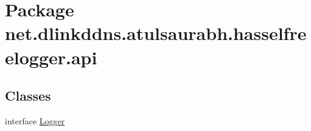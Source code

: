 \hypertarget{namespacenet_1_1dlinkddns_1_1atulsaurabh_1_1hasselfreelogger_1_1api}{}\section{Package net.\+dlinkddns.\+atulsaurabh.\+hasselfreelogger.\+api}
\label{namespacenet_1_1dlinkddns_1_1atulsaurabh_1_1hasselfreelogger_1_1api}
\subsection*{Classes}
\begin{DoxyCompactItemize}
\item 
interface \mbox{\hyperlink{interfacenet_1_1dlinkddns_1_1atulsaurabh_1_1hasselfreelogger_1_1api_1_1_logger}{Logger}}
\end{DoxyCompactItemize}

